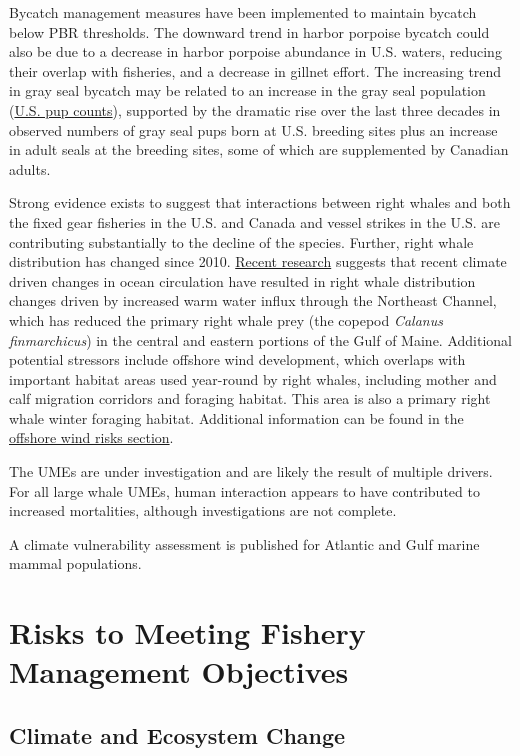 \documentclass[
  10pt,
]{article}
\begin{document}
Bycatch management measures have been implemented to maintain bycatch below PBR thresholds. The downward trend in harbor porpoise bycatch could also be due to a decrease in harbor porpoise abundance in U.S. waters, reducing their overlap with fisheries, and a decrease in gillnet effort. The increasing trend in gray seal bycatch may be related to an increase in the gray seal population (\href{https://noaa-edab.github.io/catalog/seal_pups.html}{U.S. pup counts}), supported by the dramatic rise over the last three decades in observed numbers of gray seal pups born at U.S. breeding sites plus an increase in adult seals at the breeding sites, some of which are supplemented by Canadian adults.

Strong evidence exists to suggest that interactions between right whales and both the fixed gear fisheries in the U.S. and Canada and vessel strikes in the U.S. are contributing substantially to the decline of the species. Further, right whale distribution has changed since 2010. \href{https://noaa-edab.github.io/catalog/narw.html}{Recent research} suggests that recent climate driven changes in ocean circulation have resulted in right whale distribution changes driven by increased warm water influx through the Northeast Channel, which has reduced the primary right whale prey (the copepod \emph{Calanus finmarchicus}) in the central and eastern portions of the Gulf of Maine. Additional potential stressors include offshore wind development, which overlaps with important habitat areas used year-round by right whales, including mother and calf migration corridors and foraging habitat. This area is also a primary right whale winter foraging habitat. Additional information can be found in the \hyperref[other-ocean-uses-offshore-wind]{offshore wind risks section}.

The UMEs are under investigation and are likely the result of multiple drivers. For all large whale UMEs, human interaction appears to have contributed to increased mortalities, although investigations are not complete.

A climate vulnerability assessment is published for Atlantic and Gulf marine mammal populations.

\section{Risks to Meeting Fishery Management Objectives}\label{risks-to-meeting-fishery-management-objectives}

\subsection{Climate and Ecosystem Change}\label{climate-and-ecosystem-change}
\end{document}
